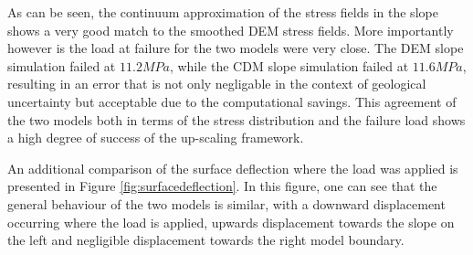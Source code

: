 As can be seen, the continuum approximation of the stress fields in the slope shows a very good match to the smoothed DEM stress fields. More importantly however is the load at failure for the two models were very close. The DEM slope simulation failed at $11.2 MPa$, while the CDM slope simulation failed at $11.6 MPa$, resulting in an error that is not only negligable in the context of geological uncertainty but acceptable due to the computational savings. This agreement of the two models both in terms of the stress distribution and the failure load shows a high degree of success of the up-scaling framework. 

An additional comparison of the surface deflection where the load was applied is presented in Figure \ref{fig:surfacedeflection}. In this figure, one can see that the general behaviour of the two models is similar, with a downward displacement occurring where the load is applied, upwards displacement towards the slope on the left and negligible displacement towards the right model boundary. 